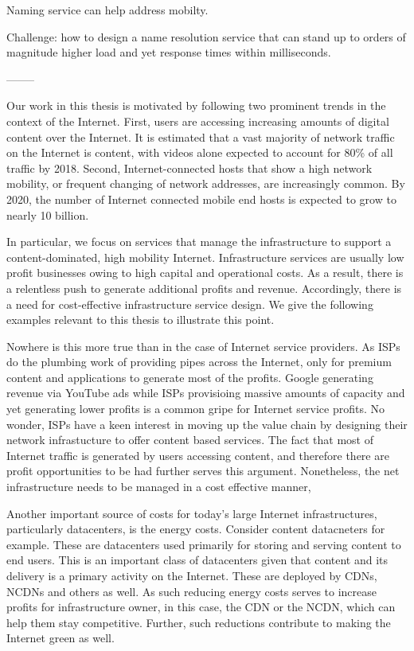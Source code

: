 Naming service can help address mobilty.

Challenge: how to design a name resolution service that can stand up to orders of magnitude higher load and yet response times within milliseconds.

--------

Our work in this thesis is motivated by following two prominent trends in the context of the Internet. First, users are accessing increasing amounts of digital content over the Internet. It is estimated that a vast majority of network traffic on the Internet is content, with videos alone expected to account for 80\% of all traffic by 2018. Second, Internet-connected hosts that show a high network mobility, or frequent changing of network addresses, are increasingly common. By 2020, the number of Internet connected mobile end hosts is expected to grow to nearly 10 billion.

In particular, we focus on services that manage the infrastructure to support a content-dominated, high mobility Internet. Infrastructure services are usually low profit businesses owing to high capital and operational costs. As a result, there is a relentless push to generate additional profits and revenue. Accordingly, there is a need for cost-effective infrastructure service design. We give the following examples relevant to this thesis to illustrate this point. 

Nowhere is this more true than in the case of Internet service providers. As ISPs do the plumbing work of providing pipes across the Internet, only for premium content and applications to generate most of the profits. Google generating revenue via YouTube ads while ISPs provisioing massive amounts of capacity and yet generating lower profits is a common gripe for Internet service profits. No wonder, ISPs have a keen interest in moving up the value chain by designing their network infrastucture to offer content based services. The fact that most of Internet traffic is generated by users accessing content, and therefore there are profit opportunities to be had further serves this argument. Nonetheless, the net infrastructure needs to be managed in a cost effective manner, 

Another important source of costs for today's large Internet infrastructures, particularly datacenters, is the energy costs. Consider content datacneters for example. These are datacenters used primarily for storing and serving content to end users. This is an important class of datacenters given that content and its delivery is a primary activity on the Internet. These are deployed by CDNs, NCDNs and others as well. As such reducing energy costs serves to increase profits for infrastructure owner, in this case, the CDN or the NCDN, which can help them stay competitive. Further, such reductions contribute to making the Internet green as well. 


